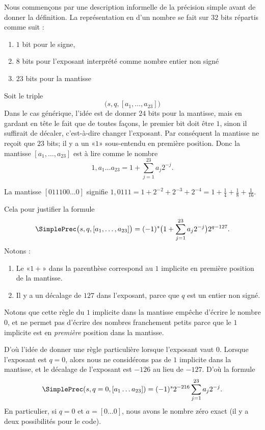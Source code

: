 Nous commençons par une description informelle de la précision simple avant de donner la définition. La représentation en  d'un nombre se fait sur \( 32\) bits répartis comme suit :
\begin{enumerate}
	\item
	      \( 1\) bit pour le signe,
	\item
	      \( 8\) bits pour l'exposant interprété comme nombre entier non signé
	\item
	      \( 23\) bits pour la mantisse
\end{enumerate}
Soit le triple
\begin{equation}
	\big( s,q,[a_1,\ldots, a_{23}] \big)
\end{equation}
Dans le cas générique, l'idée est de donner \( 24\) bits pour la mantisse, mais en gardant en tête le fait que de toutes façons, le premier bit doit être \( 1\), sinon il suffirait de décaler, c'est-à-dire changer l'exposant. Par conséquent la mantisse ne reçoit que \( 23\) bits; il y a un «\( 1\)» sous-entendu en première position. Donc la mantisse \( [a_1,\ldots, a_{23}]\) est à lire comme le nombre
\begin{equation}
	1,a_1\ldots a_{23}=1+\sum_{j=1}^{23}a_j2^{-j}.
\end{equation}
\begin{example}
	La mantisse \( [011100\ldots 0]\) signifie \(1,0111=1+2^{-2}+2^{-3}+2^{-4}=1+\frac{1}{ 4 }+\frac{1}{ 8 }+\frac{1}{ 16 } \).
\end{example}
Cela pour justifier la formule
\begin{equation}
	\SimplePrec\big( s,q,[a_1,\ldots, a_{23}] \big)=(-1)^s\big( 1+\sum_{j=1}^{23}a_j2^{-j} \big)2^{q-127}.
\end{equation}
Notons :
\begin{enumerate}
	\item
	      Le «\( 1+\)» dans la parenthèse correspond au \( 1\) implicite en première position de la mantisse.
	\item
	      Il y a un décalage de \( 127\) dans l'exposant, parce que \( q\) est un entier non signé.
\end{enumerate}

Notons que cette règle du \( 1\) implicite dans la mantisse empêche d'écrire le nombre \( 0\), et ne permet pas d'écrire des nombres franchement petits parce que le \( 1\) implicite est en \emph{première} position dans la mantisse.

D'où l'idée de donner une règle particulière lorsque l'exposant vaut \( 0\). Lorsque l'exposant est \( q=0\), alors nous ne considérons pas de \( 1\) implicite dans la mantisse, et le décalage de l'exposant est \( -126\) au lieu de \( -127\). D'où la formule
\begin{equation}
	\SimplePrec(s,q=0,[a_1\ldots a_{23}])=(-1)^s2^{-216}\sum_{j=1}^{23}a_j2^{-j}.
\end{equation}
En particulier, si \( q=0\) et \( a=[0\ldots 0]\), nous avons le nombre zéro exact (il y a deux possibilités pour le code).

